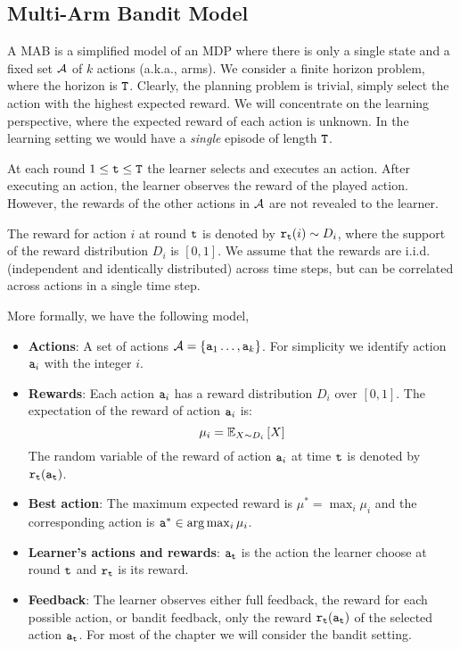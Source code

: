 
\subsection*{Multi-Arm Bandit Model}

A MAB is a simplified model of an MDP where there is only a
single state and a fixed set $\mathcal{A}$ of $k$ actions (a.k.a., arms). We consider a finite horizon problem, where the horizon is ${\tt T}$.
Clearly, the planning problem is trivial, simply select the action with the highest expected reward. We will concentrate on the learning perspective, where the expected reward of each action is unknown. In the learning setting we would have a \emph{single} episode of length ${\tt T}$.

At each round $1\leq {\tt t}\leq {\tt T}$ the learner selects and executes an action. After executing an action, the learner observes the reward of the played action. However, the rewards of the other actions in $\mathcal{A}$ are not revealed to the learner.

The reward for action $i$ at round ${\tt t}$ is denoted by ${\tt r}_{{\tt t}}(i)\sim D_{i}$, where the support of the reward distribution $D_{i}$ is $[0,1]$. We assume that the rewards are i.i.d. (independent and identically distributed) across time steps, but can be correlated across actions in a single time step.

More formally, we have the following model,
\begin{itemize}
\item \textbf{Actions}: A set of actions $\mathcal{A}=\left\{ {\tt a}_{1}\dots,{\tt a}_{k}\right\} $. For simplicity we identify action ${\tt a}_i$ with the integer $i$.
\item \textbf{Rewards}: Each action ${\tt a}_{i}$ has a reward distribution $D_{i}$ over $[0,1]$. The expectation of the reward of action ${\tt a}_i$ is:
\[
\mu_{i}=\mathbb{E}_{X\sim D_{i}}\left[X\right]
\]
The random variable of the reward of action ${\tt a}_i$ at time ${\tt t}$ is denoted by ${\tt r}_{\tt t}({\tt a}_{\tt t})$.
\item \textbf{Best action}: The maximum expected reward is $\mu^{*}= \max_{i}\mu_{i}$ and the corresponding action is ${\tt a}^*\in \arg\max_i\mu_i$.
\item \textbf{Learner's actions and rewards}: ${\tt a}_{{\tt t}}$ is the action the learner choose at round ${\tt t}$ and ${\tt r}_{\tt t}$ is its reward.
\item \textbf{Feedback}: The learner observes either full feedback, the reward for each possible action, or bandit feedback, only the reward ${\tt r}_{\tt t}({\tt a}_{\tt t})$ of the selected action ${\tt a}_{\tt t}$. For most of the chapter we will consider the bandit setting.
\end{itemize}

